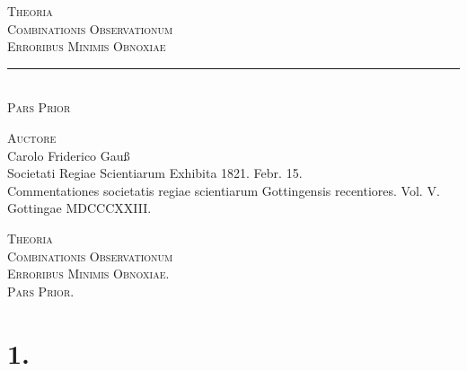 \documentclass[12pt,a4paper]{book}
\begin{document}
\newpage
\thispagestyle{empty}
\null

\mainmatter

\thispagestyle{empty}
\begin{center}
\vspace*{2cm}

{\LARGE\textsc{Theoria}}\\[1em]
{\Large\textsc{Combinationis Observationum}}\\[1em]
{\Large\textsc{Erroribus Minimis Obnoxiae}}\\[2em]

\rule{0.4\textwidth}{0.4pt}\\[1em]

{\large\textsc{Pars Prior}}\\[2em]

\vspace{1cm}

{\large\textsc{Auctore}}\\[0.5em]
{\large Carolo Friderico Gauß}\\[2em]

{\small Societati Regiae Scientiarum Exhibita 1821. Febr. 15.}\\[1em]
{\footnotesize Commentationes societatis regiae scientiarum Gottingensis recentiores. Vol. V.\\
Gottingae MDCCCXXIII.}

\end{center}

\newpage
\thispagestyle{empty}
\null

\newpage

\begin{center}
{\Large\textsc{Theoria}}\\[0.5em]
{\Large\textsc{Combinationis Observationum}}\\[0.5em]
{\Large\textsc{Erroribus Minimis Obnoxiae.}}\\[1em]
{\large\textsc{Pars Prior.}}
\end{center}

\vspace{1em}

\section*{1.}
\label{sec:art1}
\end{document}
